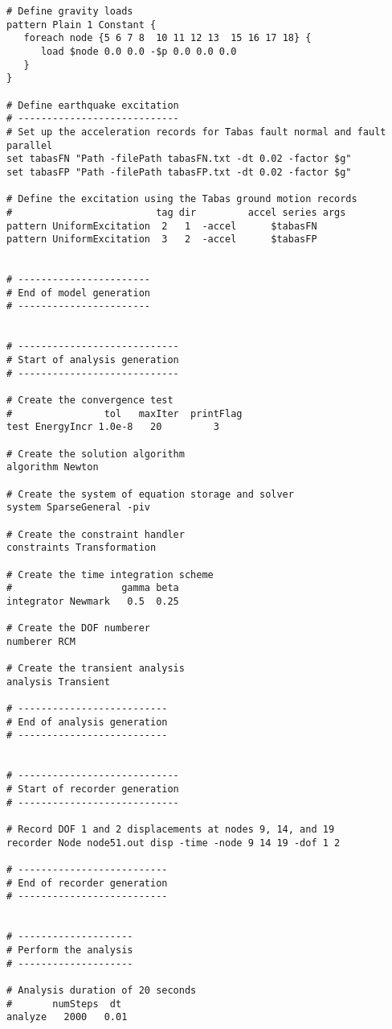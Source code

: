 \documentclass[12pt]{article}
\begin{document}
{\begin{verbatim}
# Define gravity loads
pattern Plain 1 Constant {
   foreach node {5 6 7 8  10 11 12 13  15 16 17 18} {
      load $node 0.0 0.0 -$p 0.0 0.0 0.0
   }
}

# Define earthquake excitation
# ----------------------------
# Set up the acceleration records for Tabas fault normal and fault parallel
set tabasFN "Path -filePath tabasFN.txt -dt 0.02 -factor $g"
set tabasFP "Path -filePath tabasFP.txt -dt 0.02 -factor $g"

# Define the excitation using the Tabas ground motion records
#                         tag dir         accel series args
pattern UniformExcitation  2   1  -accel      $tabasFN
pattern UniformExcitation  3   2  -accel      $tabasFP


# ----------------------- 
# End of model generation
# -----------------------


# ----------------------------
# Start of analysis generation
# ----------------------------

# Create the convergence test
#                tol   maxIter  printFlag
test EnergyIncr 1.0e-8   20         3

# Create the solution algorithm
algorithm Newton

# Create the system of equation storage and solver
system SparseGeneral -piv

# Create the constraint handler
constraints Transformation

# Create the time integration scheme
#                   gamma beta
integrator Newmark   0.5  0.25

# Create the DOF numberer
numberer RCM

# Create the transient analysis
analysis Transient

# --------------------------
# End of analysis generation
# --------------------------


# ----------------------------
# Start of recorder generation
# ----------------------------

# Record DOF 1 and 2 displacements at nodes 9, 14, and 19
recorder Node node51.out disp -time -node 9 14 19 -dof 1 2

# --------------------------
# End of recorder generation
# --------------------------


# --------------------
# Perform the analysis
# --------------------

# Analysis duration of 20 seconds
#       numSteps  dt
analyze   2000   0.01
\end{verbatim}
}
\end{document}

